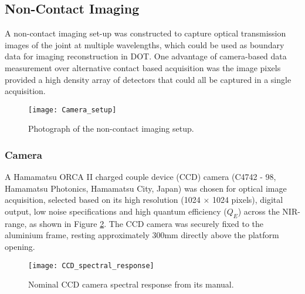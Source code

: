 \documentclass[twoside]{bhamthesis}
\theoremstyle{definition}
\begin{document}

\subsection{Non-Contact Imaging}

A non-contact imaging set-up was constructed to capture optical transmission images of the joint at multiple wavelengths, which could be used as boundary data for imaging reconstruction in DOT. One advantage of camera-based data measurement over alternative contact based acquisition was the image pixels provided a high density array of detectors that could all be captured in a single acquisition.

\begin{figure}[!ht]
\centering
  \centering
  \texttt{[image: Camera\_setup]}
	\caption{Photograph of the non-contact imaging setup.}
  \label{fig:Camera_setup}
\end{figure}

\subsubsection{Camera}

A Hamamatsu ORCA II charged couple device (CCD) camera (C4742 - 98, Hamamatsu Photonics, Hamamatsu City, Japan) was chosen for optical image acquisition, selected based on its high resolution (1024 $\times$ 1024 pixels), digital output, low noise specifications and high quantum efficiency ($Q_E$) across the NIR-range, as shown in Figure \ref{fig:CCD_spectral_response}. The CCD camera was securely fixed to the aluminium frame, resting approximately 300mm directly above the platform opening.

\begin{figure}[!ht]
\centering
  \centering
  \texttt{[image: CCD\_spectral\_response]}
	\caption{Nominal CCD camera spectral response from its  manual.}
  \label{fig:CCD_spectral_response}
\end{figure}
 
\end{document}
